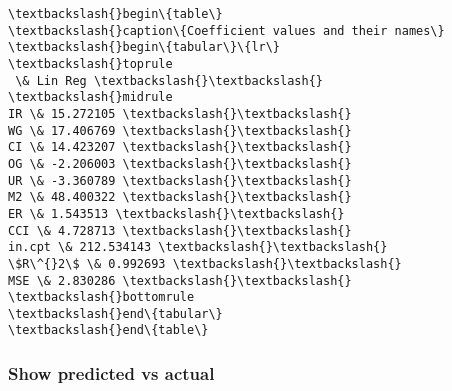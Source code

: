 \documentclass[11pt]{article}
\begin{document}
    \begin{Verbatim}[commandchars=\\\{\}]
\textbackslash{}begin\{table\}
\textbackslash{}caption\{Coefficient values and their names\}
\textbackslash{}begin\{tabular\}\{lr\}
\textbackslash{}toprule
 \& Lin Reg \textbackslash{}\textbackslash{}
\textbackslash{}midrule
IR \& 15.272105 \textbackslash{}\textbackslash{}
WG \& 17.406769 \textbackslash{}\textbackslash{}
CI \& 14.423207 \textbackslash{}\textbackslash{}
OG \& -2.206003 \textbackslash{}\textbackslash{}
UR \& -3.360789 \textbackslash{}\textbackslash{}
M2 \& 48.400322 \textbackslash{}\textbackslash{}
ER \& 1.543513 \textbackslash{}\textbackslash{}
CCI \& 4.728713 \textbackslash{}\textbackslash{}
in.cpt \& 212.534143 \textbackslash{}\textbackslash{}
\$R\^{}2\$ \& 0.992693 \textbackslash{}\textbackslash{}
MSE \& 2.830286 \textbackslash{}\textbackslash{}
\textbackslash{}bottomrule
\textbackslash{}end\{tabular\}
\textbackslash{}end\{table\}

    \end{Verbatim}

    \subsubsection{Show predicted vs actual}\label{show-predicted-vs-actual}
\end{document}
